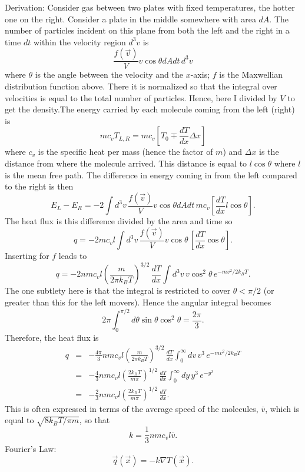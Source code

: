 \documentclass[11pt]{book}
\def\be{\begin{equation}}
\def\ee{\end{equation}}
\def\bea{\begin{eqnarray}}
\def\eea{\end{eqnarray}}
\newcommand{\vs}{\nonumber\\}
\begin{document}
Derivation: Consider gas between two plates with fixed temperatures, the hotter one on the right. Consider a plate in the middle somewhere with area $dA$. The number of particles incident on this plane from both the left and the right in a time $dt$ within the velocity region $d^3v$ is
\be
\frac{f(\vec v)}{V}  v\cos\theta dA dt\,d^3v
\ee
where $\theta$ is the angle between the velocity and the $x$-axis; $f$ is the Maxwellian distribution function above. There it is normalized so that the integral over velocities is equal to the total number of particles. Hence, here I divided by $V$ to get the density.The energy carried by each molecule coming from the left (right) is
\be
m c_v T_{L,R} = m c_v \left[ T_0 \mp \frac{dT}{dx} \Delta x \right]
\ee
where $c_v$ is the specific heat per mass (hence the factor of $m$) and $\Delta x$ is the distance from where the molecule arrived. This distance is equal to $l\cos\theta$ where $l$ is the mean free path. The difference in energy coming in from the left compared to the right is then
\be
E_L - E_R = -2 \int d^3v\,\frac{f(\vec v)}{V}  v\cos\theta dA dt\,m c_v \left[ \frac{dT}{dx} l\cos\theta \right]
.\ee
The heat flux is this difference divided by the area and time so
\be
q= -2 m c_v l \int d^3v\,\frac{f(\vec v)}{V}  v\cos\theta \,\left[  \frac{dT}{dx} \cos\theta \right]
.\ee
Inserting for $f$ leads to
\be
q= -2 nm c_v l \left( \frac{m}{2\pi k_BT}\right)^{3/2}\, \frac{dT}{dx} \int  d^3v\,v\cos^2\theta \, e^{-mv^2/2k_BT}.\ee
The one subtlety here is that the integral is restricted to cover $\theta<\pi/2$ (or greater than this for the left movers). Hence the angular integral becomes
\be
2\pi\int_0^{\pi/2} d\theta\sin\theta \cos^2\theta
=\frac{2\pi}{3}
.\ee
Therefore, the heat flux is
\bea
q &=& -\frac{4\pi}{3} nm c_v l \left( \frac{m}{2\pi k_BT}\right)^{3/2}\, \frac{dT}{dx} \int_0^\infty  dv\, v^3 \, e^{-mv^2/2k_BT}\vs
&=&
-\frac{4}{3} nm c_v l \left( \frac{2k_BT}{m\pi}\right)^{1/2}\, \frac{dT}{dx} \int_0^\infty  dy\, y^3 \, e^{-y^2}\vs
&=&
-\frac{2}{3} nm c_v l \left( \frac{2k_BT}{m\pi}\right)^{1/2}\, \frac{dT}{dx}.
\eea
This is often expressed in terms of the average speed of the molecules, $\bar v$, which is equal to $\sqrt{8k_BT/\pi m}$, so that
\be
k = \frac13 nm c_v l\bar v.\ee
Fourier's Law: \be \vec q(\vec x) = -k\nabla T(\vec x)
.\ee
\end{document}
